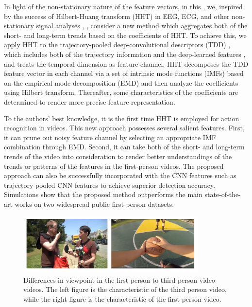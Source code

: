 In light of the non-stationary nature of the feature vectors, in
this , we, inspired by the success of Hilbert-Huang transform
(HHT) \cite{huang1998empirical} in EEG, ECG, %
and other non-stationary signal analyses \cite{xie2006mean},
\cite{echeverria2001application}, consider a new method which aggregates
both of the short- and long-term trends based on the coefficients of
HHT. To achieve this, we apply HHT to the trajectory-pooled
deep-convolutional descriptors (TDD) \cite{wang2015action},
which includes both of the trajectory information
\cite{wang2013action}
and the deep-learned features \cite{simonyan2014two}, and treats the temporal dimension as feature channel.
HHT decomposes the TDD feature vector in each channel via a set of intrinsic mode
functions (IMFs) based on the empirical mode decomposition (EMD) and
then analyze the coefficients using Hilbert transform. Thereafter,
some  characteristics of the coefficients \cite{riaz2016emd} are
determined to render more precise feature representation.


To the authors' best knowledge, it is the first time HHT is employed
for action recognition in videos. This new approach possesses
several salient features. First, it can prune out noisy feature
channel by selecting an appropriate IMF combination through EMD.
Second, it can take both of the short- and long-term trends of the
video into consideration to render better understandings of
the trends or patterns of the features in the first-person videos.
The proposed approach can also be successfully incorporated with the
CNN features such as trajectory pooled CNN features to
achieve superior detection accuracy. Simulations show that
the proposed method outperforms the main state-of-the-art works on
two widespread public first-person datasets.



\begin{figure}[!t]
\centering
\includegraphics[width=0.85\textwidth]{figures/1s}
\caption{Differences in viewpoint in the first person to third person video videos. The left figure is the characteristic of the third person video, while the right figure is the characteristic of the first-person video.
} 
\label{fig:different}
\end{figure}


